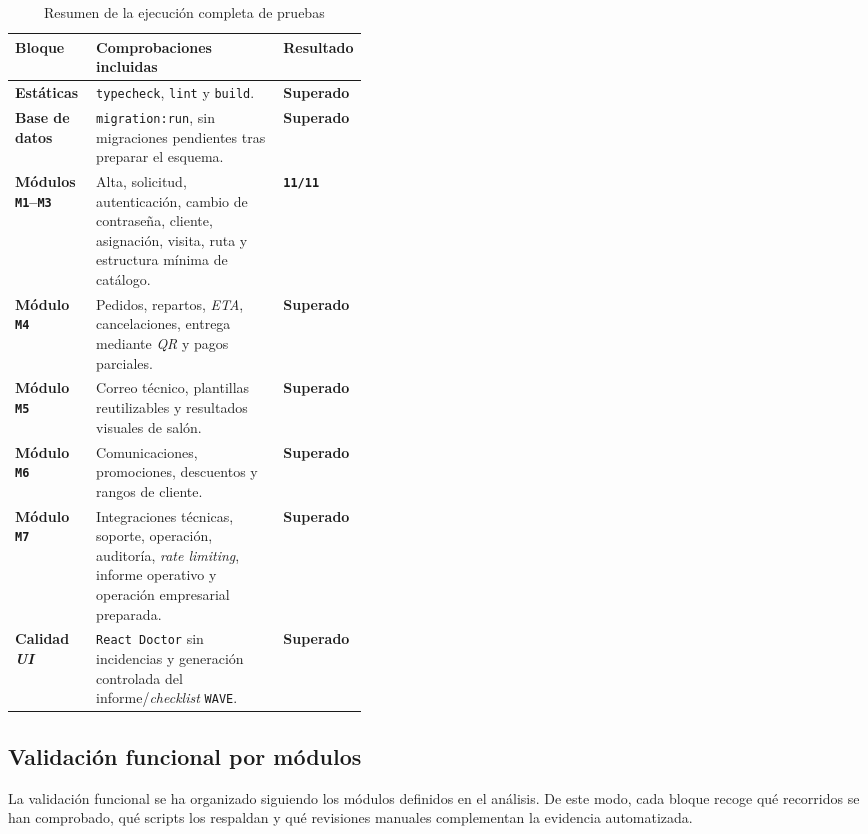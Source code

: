 \begin{table}[H]
    \centering
    \small
    \renewcommand{\arraystretch}{1.16}
    \caption{Resumen de la ejecución completa de pruebas}
    \label{tab:test-run-summary}
    \begin{tabularx}{\linewidth}{|p{0.23\linewidth}|X|p{0.18\linewidth}|}
        \hline
        \rowcolor{black!8}\textbf{Bloque} & \textbf{Comprobaciones incluidas} & \textbf{Resultado} \\
        \hline
        \textbf{Estáticas} & \texttt{typecheck}, \texttt{lint} y \texttt{build}. & \textbf{Superado} \\
        \hline
        \textbf{Base de datos} & \texttt{migration:run}, sin migraciones pendientes tras preparar el esquema. & \textbf{Superado} \\
        \hline
        \textbf{Módulos \texttt{M1}--\texttt{M3}} & Alta, solicitud, autenticación, cambio de contraseña, cliente, asignación, visita, ruta y estructura mínima de catálogo. & \textbf{\texttt{11/11}} \\
        \hline
        \textbf{Módulo \texttt{M4}} & Pedidos, repartos, \textit{ETA}, cancelaciones, entrega mediante \textit{QR} y pagos parciales. & \textbf{Superado} \\
        \hline
        \textbf{Módulo \texttt{M5}} & Correo técnico, plantillas reutilizables y resultados visuales de salón. & \textbf{Superado} \\
        \hline
        \textbf{Módulo \texttt{M6}} & Comunicaciones, promociones, descuentos y rangos de cliente. & \textbf{Superado} \\
        \hline
        \textbf{Módulo \texttt{M7}} & Integraciones técnicas, soporte, operación, auditoría, \textit{rate limiting}, informe operativo y operación empresarial preparada. & \textbf{Superado} \\
        \hline
        \textbf{Calidad \textit{UI}} & \texttt{React Doctor} sin incidencias y generación controlada del informe/\textit{checklist} \texttt{WAVE}. & \textbf{Superado} \\
        \hline
    \end{tabularx}
\end{table}

\subsection{Validación funcional por módulos}

La validación funcional se ha organizado siguiendo los módulos definidos en el análisis. De este modo, cada bloque recoge qué recorridos se han comprobado, qué scripts los respaldan y qué revisiones manuales complementan la evidencia automatizada.

